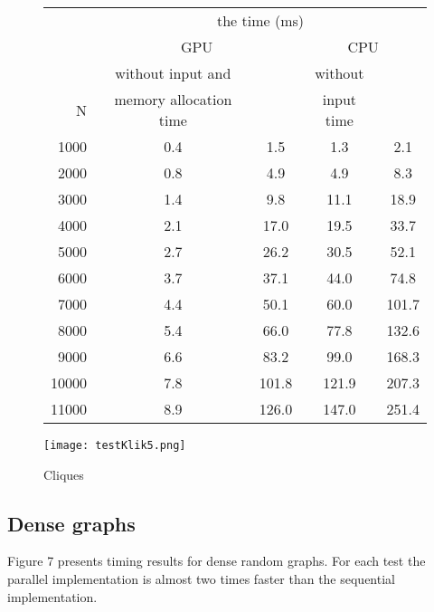 \documentclass[a4paper, 11pt]{article}
\begin{document}
\begin{figure}[h!]
    \caption{Cliques}
    \begin{center}
    \begin{tabular}{|r|c|c|c|c|}
        \hline
        & \multicolumn{4}{|c|}{the time (ms)}\\
        \cline{2-5}
        & \multicolumn{2}{|c|}{GPU} & \multicolumn{2}{|c|}{CPU}\\
        \cline{2-5}
            & without input and &  & without & \\
        N   & memory allocation time &  & input time & \\
        \hline
        1000 & 0.4 &  1.5 &  1.3 &  2.1\\
        2000 & 0.8 &  4.9 &  4.9 &  8.3\\
        3000 & 1.4 &  9.8 & 11.1 & 18.9\\
        4000 & 2.1 & 17.0 & 19.5 & 33.7\\
        5000 & 2.7 & 26.2 & 30.5 & 52.1\\
        6000 & 3.7 & 37.1 & 44.0 & 74.8\\
        7000 & 4.4 & 50.1 & 60.0 &101.7\\
        8000 & 5.4 & 66.0 & 77.8 &132.6\\
        9000 & 6.6 & 83.2 & 99.0 &168.3\\
       10000 & 7.8 &101.8 &121.9 &207.3\\
       11000 & 8.9 &126.0 &147.0 &251.4\\
        \hline
    \end{tabular}
\texttt{[image: testKlik5.png]}\\
    \end{center}
\end{figure}

\newpage
\subsection{Dense graphs}

Figure 7 presents timing results for dense random graphs. For each test the parallel 
implementation is almost two times faster than the sequential implementation.
\end{document}
